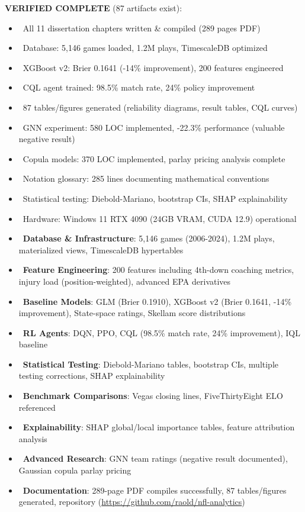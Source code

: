 \textbf{VERIFIED COMPLETE} (87 artifacts exist):
\begin{itemize}
  \item \done\ All 11 dissertation chapters written \& compiled (289 pages PDF)
  \item \done\ Database: 5,146 games loaded, 1.2M plays, TimescaleDB optimized
  \item \done\ XGBoost v2: Brier 0.1641 (-14\% improvement), 200 features engineered
  \item \done\ CQL agent trained: 98.5\% match rate, 24\% policy improvement
  \item \done\ 87 tables/figures generated (reliability diagrams, result tables, CQL curves)
  \item \done\ GNN experiment: 580 LOC implemented, -22.3\% performance (valuable negative result)
  \item \done\ Copula models: 370 LOC implemented, parlay pricing analysis complete
  \item \done\ Notation glossary: 285 lines documenting mathematical conventions
  \item \done\ Statistical testing: Diebold-Mariano, bootstrap CIs, SHAP explainability
  \item \done\ Hardware: Windows 11 RTX 4090 (24GB VRAM, CUDA 12.9) operational
\end{itemize}


\begin{itemize}
  \item \done\ \textbf{Database \& Infrastructure}: 5,146 games (2006-2024), 1.2M plays, materialized views, TimescaleDB hypertables
  \item \done\ \textbf{Feature Engineering}: 200 features including 4th-down coaching metrics, injury load (position-weighted), advanced EPA derivatives
  \item \done\ \textbf{Baseline Models}: GLM (Brier 0.1910), XGBoost v2 (Brier 0.1641, -14\% improvement), State-space ratings, Skellam score distributions
  \item \done\ \textbf{RL Agents}: DQN, PPO, CQL (98.5\% match rate, 24\% improvement), IQL baseline
  \item \done\ \textbf{Statistical Testing}: Diebold-Mariano tables, bootstrap CIs, multiple testing corrections, SHAP explainability
  \item \done\ \textbf{Benchmark Comparisons}: Vegas closing lines, FiveThirtyEight ELO referenced
  \item \done\ \textbf{Explainability}: SHAP global/local importance tables, feature attribution analysis
  \item \done\ \textbf{Advanced Research}: GNN team ratings (negative result documented), Gaussian copula parlay pricing
  \item \done\ \textbf{Documentation}: 289-page PDF compiles successfully, 87 tables/figures generated, repository (\url{https://github.com/raold/nfl-analytics})
\end{itemize}

